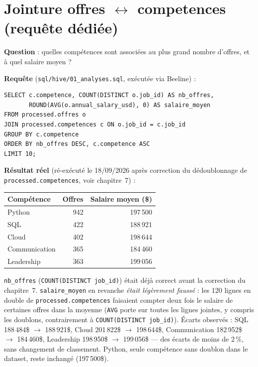 \section{Jointure offres $\leftrightarrow$ competences (requête dédiée)}

\textbf{Question} : quelles compétences sont associées au plus grand
nombre d'offres, et à quel salaire moyen ?

\textbf{Requête} (\texttt{sql/hive/01\_analyses.sql}, exécutée via Beeline) :

\begin{verbatim}
SELECT c.competence, COUNT(DISTINCT o.job_id) AS nb_offres,
       ROUND(AVG(o.annual_salary_usd), 0) AS salaire_moyen
FROM processed.offres o
JOIN processed.competences c ON o.job_id = c.job_id
GROUP BY c.competence
ORDER BY nb_offres DESC, c.competence ASC
LIMIT 10;
\end{verbatim}

\textbf{Résultat réel} (ré-exécuté le 18/09/2026 après correction du
dédoublonnage de \texttt{processed.competences}, voir chapitre~7) :

\begin{center}
\begin{tabular}{lrr}
\toprule
Compétence & Offres & Salaire moyen (\$) \\
\midrule
Python & 942 & 197\,500 \\
SQL & 422 & 188\,921 \\
Cloud & 402 & 198\,644 \\
Communication & 365 & 184\,460 \\
Leadership & 363 & 199\,056 \\
\bottomrule
\end{tabular}
\end{center}

\begin{constat}[Correction du 18/09/2026]
\texttt{nb\_offres} (\texttt{COUNT(DISTINCT job\_id)}) était déjà correct
avant la correction du chapitre~7. \texttt{salaire\_moyen} en revanche
\emph{était légèrement faussé} : les 120 lignes en double de
\texttt{processed.competences} faisaient compter deux fois le salaire
de certaines offres dans la moyenne (\texttt{AVG} porte sur toutes les
lignes jointes, y compris les doublons, contrairement à
\texttt{COUNT(DISTINCT job\_id)}). Écarts observés : SQL 188\,484\$
$\to$ 188\,921\$, Cloud 201\,822\$ $\to$ 198\,644\$, Communication
182\,952\$ $\to$ 184\,460\$, Leadership 198\,950\$ $\to$ 199\,056\$ —
des écarts de moins de 2\,\%, sans changement de classement. Python,
seule compétence sans doublon dans le dataset, reste inchangé
(197\,500\$).
\end{constat}

